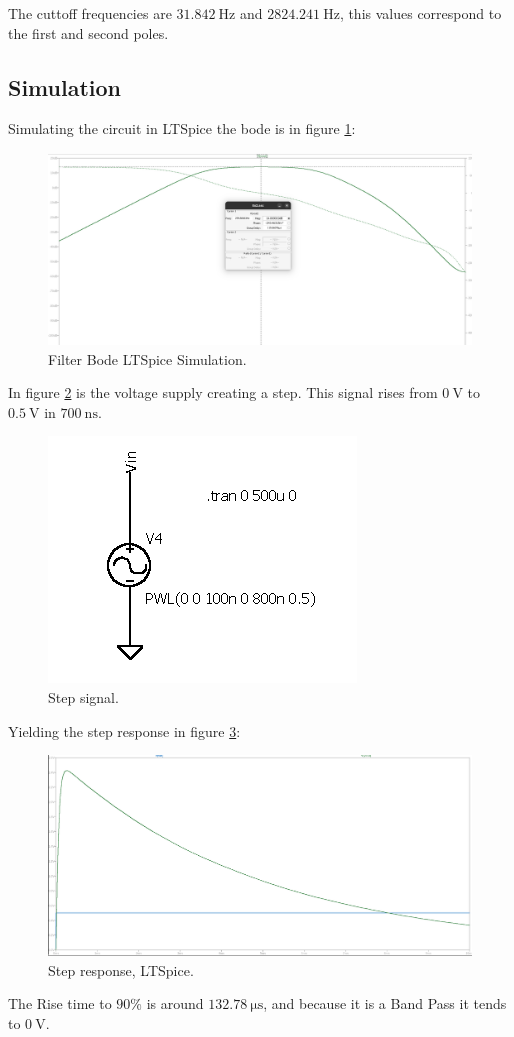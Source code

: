 The cuttoff frequencies are $\SI{31.842}{\hertz}$ and $\SI{2824.241}{\hertz}$, this values correspond to the first and second poles.

\subsection{Simulation}

Simulating the circuit in LTSpice the bode is in figure \ref{fig:P2BodeLT}:

\begin{figure}[H]
    \centering
    \includegraphics*[scale = 0.25]{Images/P2BodeLt.png}
    \caption{Filter Bode LTSpice Simulation.}
    \label{fig:P2BodeLT}
\end{figure}

In figure \ref{fig:StepSig} is the voltage supply creating a step. This signal rises from $\SI{0}{\volt}$ to $\SI{0.5}{\volt}$ in $\SI{700}{\nano\second}$.

\begin{figure}[H]
    \centering
    \includegraphics*[scale = 0.5]{Images/StepSig.png}
    \caption{Step signal.}
    \label{fig:StepSig}
\end{figure}


Yielding the step response in figure \ref{fig:StepLT}:

\begin{figure}[H]
    \centering
    \includegraphics*[scale = 0.25]{Images/StepResLT.png}
    \caption{Step response, LTSpice.}
    \label{fig:StepLT}
\end{figure}

The Rise time to $90\%$ is around $\SI{132.78}{\micro\second}$, and because it is a Band Pass it tends to $\SI{0}{\volt}$.
